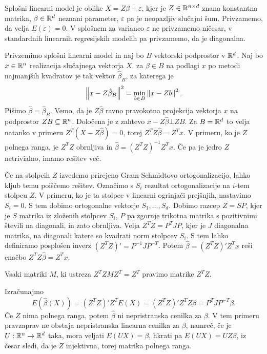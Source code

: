 
Splošni linearni model je oblike $X = Z \beta + \varepsilon$, kjer je $Z \in
\mathbb{R}^{n \times d}$ znana konstantna matrika, $\beta \in \mathbb{R}^d$ neznani parameter,
$\varepsilon$ pa je neopazljiv slučajni šum.
Privzamemo, da velja $E(\varepsilon) = 0$.
V splošnem za varianco $\varepsilon$ ne privzamemo ničesar, v standardnih
linearnih regresijskih modelih pa privzamemo, da je diagonalna.

Privzemimo splošni linearni model in naj bo $B$ vektorski podprostor v $\mathbb{R}^d$.
Naj bo $x \in \mathbb{R}^n$ realizacija slučajnega vektorja $X$.
 za $\beta \in B$ na podlagi $x$ po metodi najmanjših
kvadratov je tak vektor $\hat{\beta}_B$, za katerega je
\[
  \left\lVert x - Z \hat{\beta}_B\right\rVert^2 = \min_{b \in B} \left\lVert x - Z b\right\rVert^2.
\]
Pišimo $\hat{\beta} = \hat{\beta}_B$.
Vemo, da je $Z \hat{\beta}$ ravno pravokotna projekcija vektorja $x$ na
podprostor $Z B \subseteq \mathbb{R}^n$.
Določena je z zahtevo $x - Z \hat{\beta} \bot Z B$.
Za $B = \mathbb{R}^d$ to velja natanko v primeru $Z^T (X - Z \hat{\beta}) = 0$, torej
$Z^T Z \hat{\beta} = Z^T x$.
V primeru, ko je $Z$ polnega ranga, je $Z^T Z$ obrnljiva in $\hat{\beta} = (Z^T
Z)^{-1} Z^T x$.
Če pa je jedro $Z$ netrivialno, imamo rešitev več.

Če na stolpcih $Z$ izvedemo prirejeno Gram-Schmidtovo ortogonalizacijo, lahko
kljub temu poiščemo rešitev.
Označimo s $S_i$ rezultat ortogonalizacije na $i$-tem stolpcu $Z$.
V primeru, ko je ta stolpec v linearni ogrinjači prejšnjih, nastavimo $S_i = 0$.
S tem dobimo ortogonalne vektorje $S_1, \ldots, S_d$.
Dobimo razcep $Z = SP$, kjer je $S$ matrika iz zloženih stolpcev $S_i$, $P$ pa
zgornje trikotna matrika s pozitivnimi števili na diagonali, in zato obrnljiva.
Velja $Z^T Z = P^T J P$, kjer je $J$ diagonalna matrika, na diagonali katere so
kvadrati norm stolpcev $S_i$.
S tem lahko definiramo posplošen inverz $(Z^T Z)' = P^{-1} J P^{-T}$.
Potem $\hat{\beta} = (Z^T Z)' Z^T x$ reši enačbo $Z^T Z \hat{\beta} = Z^T
x$.

\begin{opomba}
  Vsaki matriki $M$, ki ustreza $Z^T Z M Z^T = Z^T$ pravimo  matrike $Z^T Z$.
\end{opomba}

Izračunajmo
\[
  E(\hat{\beta}(X)) = (Z^T Z)' Z^T E(X) = (Z^T Z)' Z^T Z \beta = P^T J P^{-T}
  \beta.
\]
Če $Z$ nima polnega ranga, potem $\hat{\beta}$ ni nepristranska cenilka za
$\beta$.
V tem primeru pravzaprav ne obstaja nepristranska linearna cenilka za $\beta$,
namreč, če je $U: \mathbb{R}^n \to \mathbb{R}^d$ taka, mora veljati $E(U X) = \beta$, hkrati pa
$E(UX) = U Z \beta$, iz česar sledi, da je $Z$ injektivna, torej matrika polnega
ranga.

